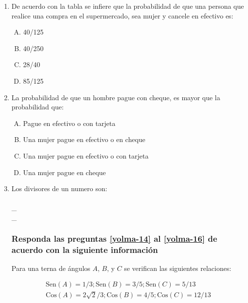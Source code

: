 \begin{enumerate}

\item De acuerdo con la tabla se infiere que la probabilidad de que una persona que realice una compra en el supermercado, sea mujer y cancele en efectivo es: \label{yolma-11}\\

\begin{enumerate}[(A)]
\item  40/125
\item 40/250
\item 28/40
\item 85/125
\end{enumerate}


\item La probabilidad de que un hombre pague con cheque, es mayor que la probabilidad que: \label{yolma-12}\\

\begin{enumerate}[(A)]
\item  Pague en efectivo o con tarjeta
\item Una mujer pague en efectivo o en cheque
\item Una mujer pague en efectivo o con tarjeta
\item Una mujer pague en cheque
\end{enumerate}


\item Los divisores de un numero son:\label{yolma-13}\\\hrulefill\\
\_\hrulefill\\
\_\hrulefill\\




\subsubsection*{Responda las preguntas \ref{yolma-14} al \ref{yolma-16} de acuerdo con la siguiente información}
Para una terna de ángulos $A$, $B$, y $C$ se verifican las siguientes relaciones:

\begin{gather}
\text{Sen}(A)=1/3; \text{Sen}(B)=3/5; \text{Sen}(C)=5/13\\
\text{Cos}(A)=2\sqrt{2}/3; \text{Cos}(B)=4/5; \text{Cos}(C)=12/13
\end{gather}


\end{enumerate}
